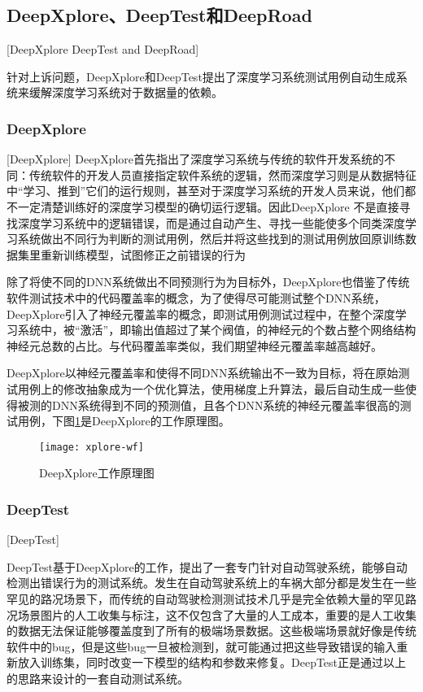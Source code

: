 \subsection{DeepXplore、DeepTest和DeepRoad}[DeepXplore DeepTest and DeepRoad]

针对上诉问题，DeepXplore和DeepTest提出了深度学习系统测试用例自动生成系统来缓解深度学习系统对于数据量的依赖。

\subsubsection{DeepXplore}[DeepXplore]
DeepXplore首先指出了深度学习系统与传统的软件开发系统的不同：传统软件的开发人员直接指定软件系统的逻辑，然而深度学习则是从数据特征中“学习、推到”它们的运行规则，甚至对于深度学习系统的开发人员来说，他们都不一定清楚训练好的深度学习模型的确切运行逻辑。因此DeepXplore
不是直接寻找深度学习系统中的逻辑错误，而是通过自动产生、寻找一些能使多个同类深度学习系统做出不同行为判断的测试用例，然后并将这些找到的测试用例放回原训练数据集里重新训练模型，试图修正之前错误的行为

除了将使不同的DNN系统做出不同预测行为为目标外，DeepXplore也借鉴了传统软件测试技术中的代码覆盖率的概念，为了使得尽可能测试整个DNN系统，DeepXplore引入了神经元覆盖率的概念，即测试用例测试过程中，在整个深度学习系统中，被“激活”，即输出值超过了某个阀值，的神经元的个数占整个网络结构神经元总数的占比。与代码覆盖率类似，我们期望神经元覆盖率越高越好。

DeepXplore以神经元覆盖率和使得不同DNN系统输出不一致为目标，将在原始测试用例上的修改抽象成为一个优化算法，使用梯度上升算法，最后自动生成一些使得被测的DNN系统得到不同的预测值，且各个DNN系统的神经元覆盖率很高的测试用例，下图\ref{xplore-wf}是DeepXplore的工作原理图。

\begin{figure}[h]
    \centering
    \texttt{[image: xplore-wf]}
    \caption{DeepXplore工作原理图\cite[图~5]{DeepXplore}}
    \label{xplore-wf}
\end{figure}

\subsubsection{DeepTest}[DeepTest]

DeepTest基于DeepXplore的工作，提出了一套专门针对自动驾驶系统，能够自动检测出错误行为的测试系统。发生在自动驾驶系统上的车祸大部分都是发生在一些罕见的路况场景下，而传统的自动驾驶检测测试技术几乎是完全依赖大量的罕见路况场景图片的人工收集与标注，这不仅包含了大量的人工成本，重要的是人工收集的数据无法保证能够覆盖度到了所有的极端场景数据。这些极端场景就好像是传统软件中的bug，但是这些bug一旦被检测到，就可能通过把这些导致错误的输入重新放入训练集，同时改变一下模型的结构和参数来修复。DeepTest正是通过以上的思路来设计的一套自动测试系统。

